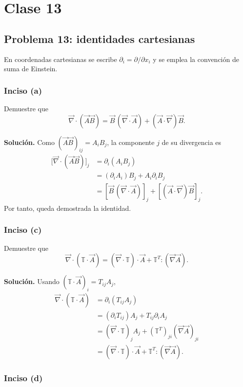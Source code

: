 \chapter{Clase 13}

\section{Problema 13: identidades cartesianas}

En coordenadas cartesianas se escribe $\partial_i=\partial/\partial x_i$ y se emplea la convención de suma de Einstein.

\subsection*{Inciso (a)}

Demuestre que
\[
\vec\nabla\cdot(\vec A\vec B)
=\vec B\,(\vec\nabla\cdot\vec A)
+(\vec A\cdot\vec\nabla)\vec B.
\]

\textbf{Solución.} Como $(\vec A\vec B)_{ij}=A_iB_j$, la componente $j$ de su divergencia es
\[
\begin{aligned}
\bigl[\vec\nabla\cdot(\vec A\vec B)\bigr]_j
&=\partial_i(A_iB_j)\\
&=(\partial_iA_i)B_j+A_i\partial_iB_j\\
&=[\vec B\,(\vec\nabla\cdot\vec A)]_j
  +[(\vec A\cdot\vec\nabla)\vec B]_j.
\end{aligned}
\]
Por tanto, queda demostrada la identidad.

\subsection*{Inciso (c)}

Demuestre que
\[
\vec\nabla\cdot(\mathbb T\cdot\vec A)
=(\vec\nabla\cdot\mathbb T)\cdot\vec A
+\mathbb T^T:(\vec\nabla\vec A).
\]

\textbf{Solución.} Usando $(\mathbb T\cdot\vec A)_i=T_{ij}A_j$,
\[
\begin{aligned}
\vec\nabla\cdot(\mathbb T\cdot\vec A)
&=\partial_i(T_{ij}A_j)\\
&=(\partial_iT_{ij})A_j+T_{ij}\partial_iA_j\\
&=(\vec\nabla\cdot\mathbb T)_jA_j
  +(\mathbb T^T)_{ji}(\vec\nabla\vec A)_{ji}\\
&=(\vec\nabla\cdot\mathbb T)\cdot\vec A
  +\mathbb T^T:(\vec\nabla\vec A).
\end{aligned}
\]

\subsection*{Inciso (d)}

